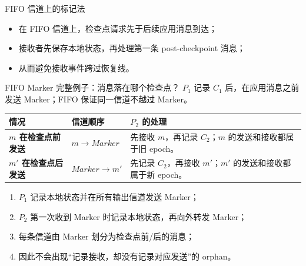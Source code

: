 \documentclass[UTF8,fontset=none,aspectratio=169,10pt]{beamer}
\begin{document}
\begin{frame}{FIFO 信道上的标记法}
\begin{center}
\end{center}
\begin{itemize}
  \item 在 FIFO 信道上，检查点请求先于后续应用消息到达；
  \item 接收者先保存本地状态，再处理第一条 post-checkpoint 消息；
  \item 从而避免接收事件跨过恢复线。
\end{itemize}
\end{frame}

\begin{frame}{FIFO Marker 完整例子：消息落在哪个检查点？}
\small
$P_1$ 记录 $C_1$ 后，在应用消息之前发送 Marker；FIFO 保证同一信道不越过 Marker。
\begin{center}
\begin{tabularx}{.96\linewidth}{>{\bfseries}p{3cm}p{2.8cm}X}
\toprule
情况 & 信道顺序 & $P_2$ 的处理 \\
\midrule
$m$ 在检查点前发送 & $m \rightarrow Marker$ & 先接收 $m$，再记录 $C_2$；$m$ 的发送和接收都属于旧 epoch。 \\
$m'$ 在检查点后发送 & $Marker \rightarrow m'$ & 先记录 $C_2$，再接收 $m'$；$m'$ 的发送和接收都属于新 epoch。 \\
\bottomrule
\end{tabularx}
\end{center}
\begin{enumerate}
  \item $P_1$ 记录本地状态并在所有输出信道发送 Marker；
  \item $P_2$ 第一次收到 Marker 时记录本地状态，再向外转发 Marker；
  \item 每条信道由 Marker 划分为检查点前/后的消息；
  \item 因此不会出现“记录接收，却没有记录对应发送”的 orphan。
\end{enumerate}
\end{frame}
\end{document}
